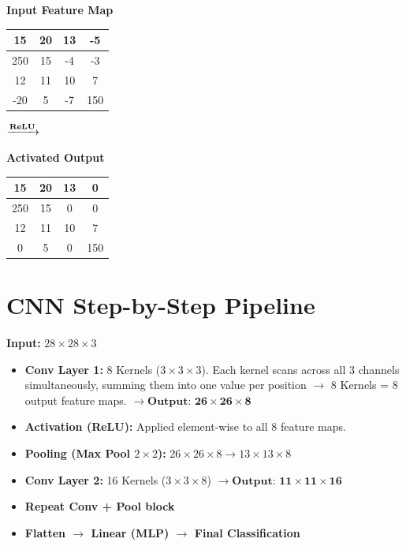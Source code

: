 \begin{center}
\begin{minipage}{0.4\textwidth}
\centering
\textbf{Input Feature Map} \\[0.4em]
\begin{tabular}{|c|c|c|c|}
\hline
15 & 20 & 13 & -5 \\ \hline
250 & 15 & -4 & -3 \\ \hline
12 & 11 & 10 & 7 \\ \hline
-20 & 5 & -7 & 150 \\ \hline
\end{tabular}
\end{minipage}
\quad $\xrightarrow{\text{\textbf{ReLU}}}$ \quad
\begin{minipage}{0.4\textwidth}
\centering
\textbf{Activated Output} \\[0.4em]
\begin{tabular}{|c|c|c|c|}
\hline
15 & 20 & 13 & 0 \\ \hline
250 & 15 & 0 & 0 \\ \hline
12 & 11 & 10 & 7 \\ \hline
0 & 5 & 0 & 150 \\ \hline
\end{tabular}
\end{minipage}
\end{center}

\section{CNN Step-by-Step Pipeline}

\begin{propertybox}
\textbf{Input:} $28 \times 28 \times 3$
\begin{itemize}
    \item \textbf{Conv Layer 1:} 8 Kernels ($3 \times 3 \times 3$). Each kernel scans across all 3 channels simultaneously, summing them into one value per position $\to$ 8 Kernels = 8 output feature maps. \quad $\mathbf{\to \text{Output: } 26 \times 26 \times 8}$
    \item \textbf{Activation (ReLU):} Applied element-wise to all 8 feature maps.
    \item \textbf{Pooling (Max Pool $2 \times 2$):} $26 \times 26 \times 8 \to 13 \times 13 \times 8$
    \item \textbf{Conv Layer 2:} 16 Kernels ($3 \times 3 \times 8$) $\mathbf{\to \text{Output: } 11 \times 11 \times 16}$
    \item \textbf{Repeat Conv + Pool block}
    \item \textbf{Flatten $\to$ Linear (MLP) $\to$ Final Classification}
\end{itemize}
\end{propertybox}

